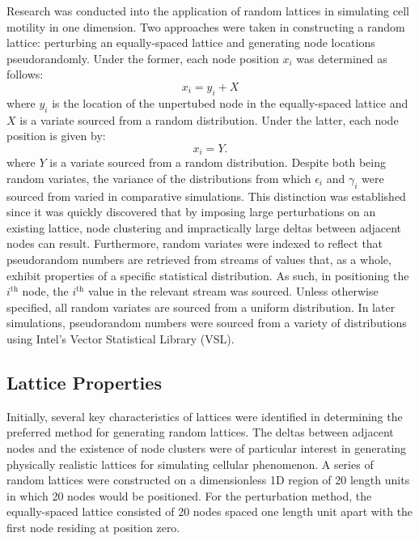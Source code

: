 \documentclass[11pt,a4paper]{article}
\begin{document}
	Research was conducted into the application of random lattices in simulating cell motility in one dimension. Two approaches were taken in constructing a random lattice: perturbing an equally-spaced lattice and generating node locations pseudorandomly. Under the former, each node position $x_i$ was determined as follows:
	\begin{equation*}
		x_i = y_i + X
	\end{equation*}
	where $y_i$ is the location of the unpertubed node in the equally-spaced lattice and $X$ is a variate sourced from a random distribution. Under the latter, each node position is given by:
	\begin{equation*}
		x_i = Y.
	\end{equation*}
	where $Y$ is a variate sourced from a random distribution. Despite both being random variates, the variance of the distributions from which $\epsilon_i$ and $\gamma_i$ were sourced from varied in comparative simulations. This distinction was established since it was quickly discovered that by imposing large perturbations on an existing lattice, node clustering and impractically large deltas between adjacent nodes can result. Furthermore, random variates were indexed to reflect that pseudorandom numbers are retrieved from streams of values that, as a whole, exhibit properties of a specific statistical distribution. As such, in positioning the $i^{\text{th}}$ node, the $i^{\text{th}}$ value in the relevant stream was sourced. Unless otherwise specified, all random variates are sourced from a uniform distribution. In later simulations, pseudorandom numbers were sourced from a variety of distributions using Intel's Vector Statistical Library (VSL).

	\subsection{Lattice Properties}
		\label{sub:latticeproperties}
		
		Initially, several key characteristics of lattices were identified in determining the preferred method for generating random lattices. The deltas between adjacent nodes and the existence of node clusters were of particular interest in generating physically realistic lattices for simulating cellular phenomenon. A series of random lattices were constructed on a dimensionless 1D region of 20 length units in which 20 nodes would be positioned. For the perturbation method, the equally-spaced lattice consisted of 20 nodes spaced one length unit apart with the first node residing at position zero. 
\end{document}
